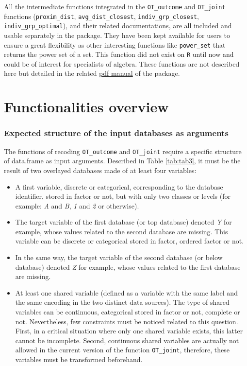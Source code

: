 All the intermediate functions integrated in the \texttt{OT\_outcome} and \texttt{OT\_joint} functions (\texttt{proxim\_dist}, \texttt{avg\_dist\_closest}, \texttt{indiv\_grp\_closest}, \texttt{indiv\_grp\_optimal}), and their related documentations, are all included and usable separately in the package. They have been kept available for users to ensure a great flexibility as other interesting functions like \texttt{power\_set} that returns the power set of a set. This function did not exist on \texttt{R} until now and could be of interest for specialists of algebra. These functions are not described here but detailed in the related \href{https://cran.r-project.org//web//packages//OTrecod//OTrecod.pdf}{pdf manual} of the package.

\hypertarget{functionalities-overview}{%
\section{Functionalities overview}\label{functionalities-overview}}

\hypertarget{expected-structure-of-the-input-databases-as-arguments}{%
\subsubsection{Expected structure of the input databases as arguments}\label{expected-structure-of-the-input-databases-as-arguments}}

The functions of recoding \texttt{OT\_outcome} and \texttt{OT\_joint} require a specific structure of data.frame as input arguments. Described in Table \ref{tab:tab3}, it must be the result of two overlayed databases made of at least four variables:

\begin{itemize}
\tightlist
\item
  A first variable, discrete or categorical, corresponding to the database identifier, stored in factor or not, but with only two classes or levels (for example: \emph{A} and \emph{B}, \emph{1} and \emph{2} or otherwise).
\item
  The target variable of the first database (or top database) denoted \emph{Y} for example, whose values related to the second database are missing. This variable can be discrete or categorical stored in factor, ordered factor or not.
\item
  In the same way, the target variable of the second database (or below database) denoted \emph{Z} for example, whose values related to the first database are missing.
\item
  At least one shared variable (defined as a variable with the same label and the same encoding in the two distinct data sources). The type of shared variables can be continuous, categorical stored in factor or not, complete or not. Nevertheless, few constraints must be noticed related to this question. First, in a critical situation where only one shared variable exists, this latter cannot be incomplete. Second, continuous shared variables are actually not allowed in the current version of the function \texttt{OT\_joint}, therefore, these variables must be transformed beforehand.
\end{itemize}

